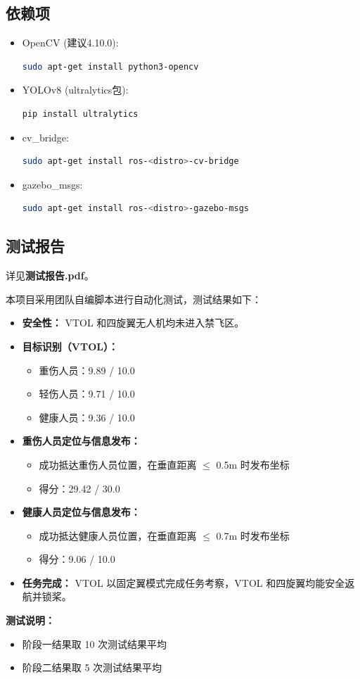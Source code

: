 \documentclass[12pt]{article}
\begin{document}
\subsection{依赖项}
\begin{itemize}
    \item OpenCV (建议4.10.0): 
    \begin{lstlisting}[language=bash]
    sudo apt-get install python3-opencv
    \end{lstlisting}
    \item YOLOv8 (ultralytics包):
    \begin{lstlisting}[language=bash]
    pip install ultralytics
    \end{lstlisting}
    \item cv\_bridge:
    \begin{lstlisting}[language=bash]
    sudo apt-get install ros-<distro>-cv-bridge
    \end{lstlisting}
    \item gazebo\_msgs:
    \begin{lstlisting}[language=bash]
    sudo apt-get install ros-<distro>-gazebo-msgs
    \end{lstlisting}
\end{itemize}

\subsection{测试报告}
详见\textbf{测试报告.pdf}。

本项目采用团队自编脚本进行自动化测试，测试结果如下：

\begin{itemize}
    \item \textbf{安全性：} VTOL 和四旋翼无人机均未进入禁飞区。
    \item \textbf{目标识别（VTOL）：}
    \begin{itemize}
        \item 重伤人员：9.89 / 10.0
        \item 轻伤人员：9.71 / 10.0
        \item 健康人员：9.36 / 10.0
    \end{itemize}
    \item \textbf{重伤人员定位与信息发布：}
    \begin{itemize}
        \item 成功抵达重伤人员位置，在垂直距离 $\leq$ 0.5m 时发布坐标
        \item 得分：29.42 / 30.0
    \end{itemize}
    \item \textbf{健康人员定位与信息发布：}
    \begin{itemize}
        \item 成功抵达健康人员位置，在垂直距离 $\leq$ 0.7m 时发布坐标
        \item 得分：9.06 / 10.0
    \end{itemize}
    \item \textbf{任务完成：} VTOL 以固定翼模式完成任务考察，VTOL 和四旋翼均能安全返航并锁桨。
\end{itemize}

\noindent
\textbf{测试说明：}
\begin{itemize}
    \item 阶段一结果取 10 次测试结果平均
    \item 阶段二结果取 5 次测试结果平均
\end{itemize}
\end{document}
